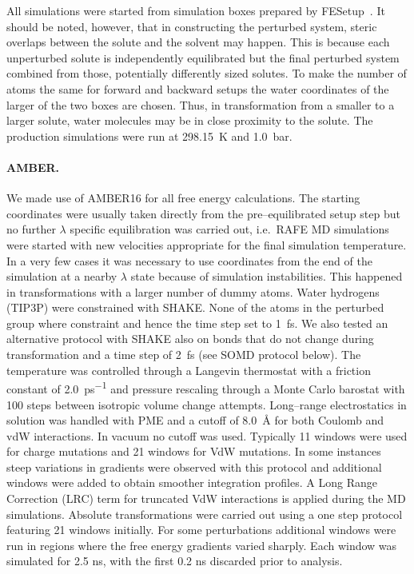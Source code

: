 \documentclass[journal=jctcce,manuscript=article]{achemso}
\begin{document}
All simulations were started from simulation boxes prepared by
FESetup~\cite{loeffler_fesetup:_2015}.  It should be noted, however, that in
constructing the perturbed system, steric overlaps between the solute and the
solvent may happen.  This is because each unperturbed solute is independently
equilibrated but the final perturbed system combined from those, potentially
differently sized solutes.  To make the number of atoms the same for forward
and backward setups the water coordinates of the larger of the two boxes are
chosen.  Thus, in transformation from a smaller to a larger solute, water
molecules may be in close proximity to the solute.  The production simulations
were run at \SI{298.15}{K} and \SI{1.0}{bar}.

\paragraph{AMBER.} We made use of AMBER16 for all free energy calculations. The
starting coordinates were usually taken directly from the pre--equilibrated
setup step but no further $\lambda$ specific equilibration was carried out,
i.e.\ RAFE MD simulations were started with new velocities appropriate for the
final simulation temperature.  In a very few cases it was necessary to use
coordinates from the end of the simulation at a nearby $\lambda$ state because
of simulation instabilities.  This happened in transformations with a larger
number of dummy atoms.  Water hydrogens (TIP3P) were constrained with SHAKE.
None of the atoms in the perturbed group where constraint and hence the time
step set to \SI{1}{fs}.  We also tested an alternative protocol with
SHAKE also on bonds that do not change during transformation and a time step of
\SI{2}{fs} (see SOMD protocol below).  The temperature was controlled through a
Langevin thermostat with a friction constant of \SI{2.0}{ps^{-1}} and pressure
rescaling through a Monte Carlo barostat with 100 steps between isotropic
volume change attempts.  Long--range electrostatics in solution was handled
with PME and a cutoff of \SI{8.0}{\angstrom} for both Coulomb and vdW
interactions.  In vacuum no cutoff was used.  Typically 11 windows
were used for charge mutations and 21 windows for VdW mutations.  In
some instances steep variations in gradients were observed with this
protocol and additional windows were added to obtain smoother
integration profiles.  A Long Range Correction (LRC) term for
truncated VdW interactions is applied during the MD simulations.
Absolute transformations were carried out using a one step protocol
featuring 21 windows initially.  For some perturbations additional
windows were run in regions where the free energy gradients varied
sharply.  Each window was simulated for 2.5 ns, with the first 0.2 ns
discarded prior to analysis.
\end{document}
